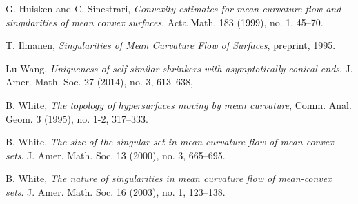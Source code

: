 \documentclass{amsart}
\theoremstyle{definition}
\begin{document}
\begin{thebibliography}{A}
G. Huisken and C. Sinestrari, 
{\emph{Convexity estimates for mean curvature flow and singularities of mean convex surfaces}},
 Acta Math. 183 (1999), no. 1, 45--70.
 
 T. Ilmanen,  {\emph{Singularities of Mean Curvature Flow of Surfaces}}, preprint, 1995.

 Lu Wang, {\emph{Uniqueness of self-similar shrinkers with asymptotically conical ends}}, J. Amer. Math. Soc. 27 (2014), no. 3, 613--638,
 
  
B. White, \emph{The topology of hypersurfaces moving by mean curvature}, Comm. Anal.
Geom. 3 (1995), no. 1-2, 317--333.

B. White, \emph{The size of the singular set in mean curvature flow of mean-convex sets}. 
J. Amer. Math. Soc. 13 (2000), no. 3, 665--695.

B. White, \emph{The nature of singularities in mean curvature flow of mean-convex sets}.
J. Amer. Math. Soc. 16 (2003), no. 1, 123--138.


\end{thebibliography}
\end{document}
